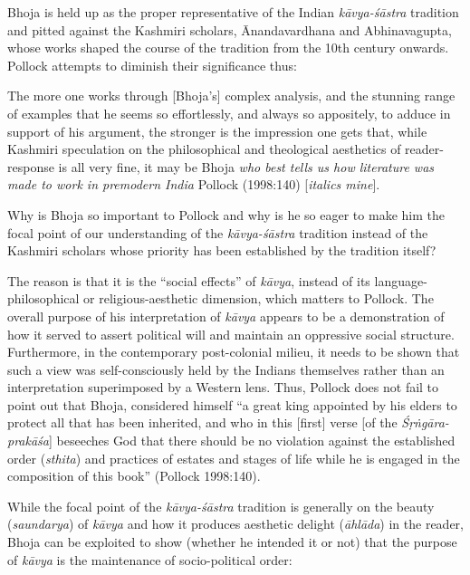 Bhoja is held up as the proper representative of the Indian \textsl{kāvya-śāstra} tradition and pitted against the Kashmiri scholars, Ānandavardhana and Abhinavagupta, whose works shaped the course of the tradition from the 10th century onwards. Pollock attempts to diminish their significance thus:

\begin{myquote}
The more one works through [Bhoja's] complex analysis, and the stunning range of examples that he seems so effortlessly, and always so appositely, to adduce in support of his argument, the stronger is the impression one gets that, while Kashmiri speculation on the philosophical and theological aesthetics of reader-response is all very fine, it may be Bhoja \textsl{who best tells us how literature was made to work in premodern India} 
\hfill Pollock (1998:140) [\textsl{italics mine}].
\end{myquote}

Why is Bhoja so important to Pollock and why is he so eager to make him the focal point of our understanding of the \textsl{kāvya-śāstra} tradition instead of the Kashmiri scholars whose priority has been established by the tradition itself? 

The reason is that it is the ``social effects'' of \textsl{kāvya}, instead of its language-philosophical or religious-aesthetic dimension, which matters to Pollock. The overall purpose of his interpretation of \textsl{kāvya} appears to be a demonstration of how it served to assert political will and maintain an oppressive social structure. Furthermore, in the contemporary post-colonial milieu, it needs to be shown that such a view was self-consciously held by the Indians themselves rather than an interpretation superimposed by a Western lens. Thus, Pollock does not fail to point out that Bhoja, considered himself ``a great king appointed by his elders to protect all that has been inherited, and who in this [first] verse [of the \textsl{Śṛṅgāra-prakāśa}] beseeches God that there should be no violation against the established order (\textsl{sthita}) and practices of estates and stages of life while he is engaged in the composition of this book'' (Pollock 1998:140).

While the focal point of the \textsl{kāvya-śāstra} tradition is generally on the beauty (\textsl{saundarya}) of \textsl{kāvya} and how it produces aesthetic delight (\textsl{āhlāda}) in the reader, Bhoja can be exploited to show (whether he intended it or not) that the purpose of \textsl{kāvya} is the maintenance of socio-political order:

